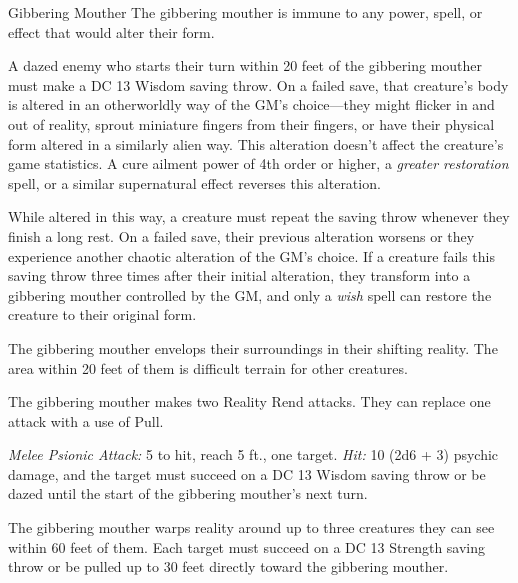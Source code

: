 \documentclass[10pt,a4paper,twoside,bg=print,twocolumn,openany,nodeprecatedcode]{dndbook}
\begin{document}
\begin{DndMonster}[float=t]{Gibbering Mouther}
\DndMonsterBasics[
armor-class = {11 (natural armor)},
hit-points = {\DndDice{8d8 + 24}},
speed = {10 ft., fly 10 ft. \textit{(hover)}, swim 10 ft.}
]
\DndMonsterAbilityScores[
 str = 12,
 dex = 12,
 con = 16,
 int = 7,
 wis = 10,
 cha = 5
]
\DndMonsterDetails[
saving-throws = {Con +5},
condition-immunities = {charmed, frightened, prone},
senses = {darkvision 60 ft., passive perception 10},
languages = {speaks all languages but doesn't understand any},
challenge = 2,
]
The gibbering mouther is immune to any power, spell, or effect that would alter their form.

A dazed enemy who starts their turn within 20 feet of the gibbering mouther must make a DC 13 Wisdom saving throw. On a failed save, that creature's body is altered in an otherworldly way of the GM's choice—they might flicker in and out of reality, sprout miniature fingers from their fingers, or have their physical form altered in a similarly alien way. This alteration doesn't affect the creature's game statistics. A cure ailment power of 4th order or higher, a \textit{greater restoration} spell, or a similar supernatural effect reverses this alteration.

While altered in this way, a creature must repeat the saving throw whenever they finish a long rest. On a failed save, their previous alteration worsens or they experience another chaotic alteration of the GM's choice. If a creature fails this saving throw three times after their initial alteration, they transform into a gibbering mouther controlled by the GM, and only a \textit{wish} spell can restore the creature to their original form.

The gibbering mouther envelops their surroundings in their shifting reality. The area within 20 feet of them is difficult terrain for other creatures.

The gibbering mouther makes two Reality Rend attacks. They can replace one attack with a use of Pull.

\textsl{Melee Psionic Attack:} 5 to hit, reach 5 ft., one target. \textsl{Hit:} 10 (2d6 + 3) psychic damage, and the target must succeed on a DC 13 Wisdom saving throw or be dazed until the start of the gibbering mouther's next turn.

The gibbering mouther warps reality around up to three creatures they can see within 60 feet of them. Each target must succeed on a DC 13 Strength saving throw or be pulled up to 30 feet directly toward the gibbering mouther.

\end{DndMonster}
\end{document}
